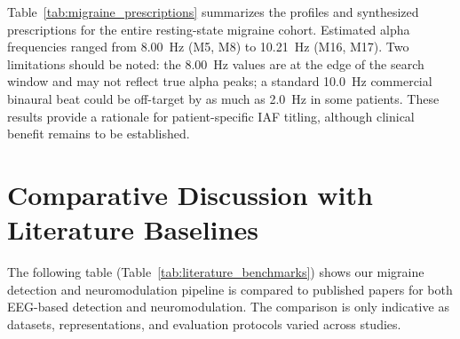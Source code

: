 \documentclass[12pt, a4paper]{report}
\begin{document}
Table~\ref{tab:migraine_prescriptions} summarizes the profiles and synthesized prescriptions for the entire resting-state migraine cohort. Estimated alpha frequencies ranged from 8.00~Hz (M5, M8) to 10.21~Hz (M16, M17). Two limitations should be noted: the 8.00~Hz values are at the edge of the search window and may not reflect true alpha peaks; a standard 10.0~Hz commercial binaural beat could be off-target by as much as 2.0~Hz in some patients. These results provide a rationale for patient-specific IAF titling, although clinical benefit remains to be established.

\section{Comparative Discussion with Literature Baselines}
\label{sec:comparative_discussion}
The following table (Table~\ref{tab:literature_benchmarks}) shows our migraine detection and neuromodulation pipeline is compared to published papers for both EEG-based detection and neuromodulation. The comparison is only indicative as datasets, representations, and evaluation protocols varied across studies.
\end{document}
